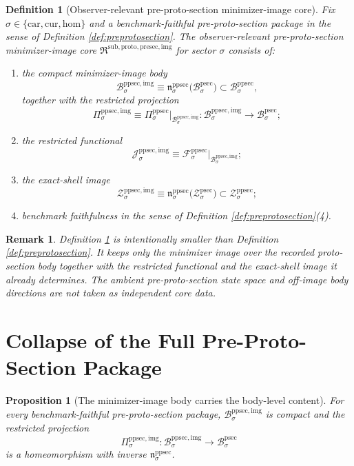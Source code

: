 \documentclass[11pt]{article}
\newcommand{\Car}{\mathrm{car}}
\newcommand{\Cur}{\mathrm{cur}}
\newcommand{\Hom}{\mathrm{hom}}
\newcommand{\ProtoSectionBody}[1]{\mathcal B_{#1}^{\mathrm{psec}}}
\newcommand{\ProtoSectionShell}[1]{\mathcal Z_{#1}^{\mathrm{psec}}}
\newcommand{\PreProtoSectionBody}[1]{\mathcal B_{#1}^{\mathrm{ppsec}}}
\newcommand{\PreProtoSectionProj}[1]{\Pi_{#1}^{\mathrm{ppsec}}}
\newcommand{\PreProtoSectionProtoMin}[1]{\mathfrak n_{#1}^{\mathrm{ppsec}}}
\newcommand{\PreProtoSectionFunctional}[1]{\mathscr F_{#1}^{\mathrm{ppsec}}}
\newcommand{\PreProtoSectionShell}[1]{\mathcal Z_{#1}^{\mathrm{ppsec}}}
\newcommand{\PreProtoSectionImageCore}{\mathfrak R^{\mathrm{sub,proto,presec,img}}}
\newcommand{\PreProtoSectionImgBody}[1]{\mathcal B_{#1}^{\mathrm{ppsec,img}}}
\newcommand{\PreProtoSectionImgProj}[1]{\Pi_{#1}^{\mathrm{ppsec,img}}}
\newcommand{\PreProtoSectionImgFunctional}[1]{\mathscr J_{#1}^{\mathrm{ppsec,img}}}
\newcommand{\PreProtoSectionImgShell}[1]{\mathcal Z_{#1}^{\mathrm{ppsec,img}}}
\newtheorem{definition}{Definition}
\newtheorem{proposition}{Proposition}
\newtheorem{remark}{Remark}
\begin{document}
\begin{definition}[Observer-relevant pre-proto-section minimizer-image core]
\label{def:imagecore}
Fix \(\sigma\in\{\Car,\Cur,\Hom\}\) and a benchmark-faithful pre-proto-section package in the sense of Definition \ref{def:preprotosection}. The \emph{observer-relevant pre-proto-section minimizer-image core} \(\PreProtoSectionImageCore\) for sector \(\sigma\) consists of:
\begin{enumerate}
    \item the compact minimizer-image body
    \[
    \PreProtoSectionImgBody{\sigma}
    \equiv
    \PreProtoSectionProtoMin{\sigma}\bigl(\ProtoSectionBody{\sigma}\bigr)
    \subset
    \PreProtoSectionBody{\sigma},
    \]
    together with the restricted projection
    \[
    \PreProtoSectionImgProj{\sigma}
    \equiv
    \PreProtoSectionProj{\sigma}\big|_{\PreProtoSectionImgBody{\sigma}}
    :
    \PreProtoSectionImgBody{\sigma}\to\ProtoSectionBody{\sigma};
    \]
    \item the restricted functional
    \[
    \PreProtoSectionImgFunctional{\sigma}
    \equiv
    \PreProtoSectionFunctional{\sigma}\big|_{\PreProtoSectionImgBody{\sigma}};
    \]
    \item the exact-shell image
    \[
    \PreProtoSectionImgShell{\sigma}
    \equiv
    \PreProtoSectionProtoMin{\sigma}\bigl(\ProtoSectionShell{\sigma}\bigr)
    \subset
    \PreProtoSectionShell{\sigma};
    \]
    \item benchmark faithfulness in the sense of Definition \ref{def:preprotosection}(4).
\end{enumerate}
\end{definition}

\begin{remark}
Definition \ref{def:imagecore} is intentionally smaller than Definition \ref{def:preprotosection}. It keeps only the minimizer image over the recorded proto-section body together with the restricted functional and the exact-shell image it already determines. The ambient pre-proto-section state space and off-image body directions are not taken as independent core data.
\end{remark}

\section{Collapse of the Full Pre-Proto-Section Package}

\begin{proposition}[The minimizer-image body carries the body-level content]
\label{prop:body}
For every benchmark-faithful pre-proto-section package, \(\PreProtoSectionImgBody{\sigma}\) is compact and the restricted projection
\[
\PreProtoSectionImgProj{\sigma}:\PreProtoSectionImgBody{\sigma}\to\ProtoSectionBody{\sigma}
\]
is a homeomorphism with inverse \(\PreProtoSectionProtoMin{\sigma}\).
\end{proposition}
\end{document}
